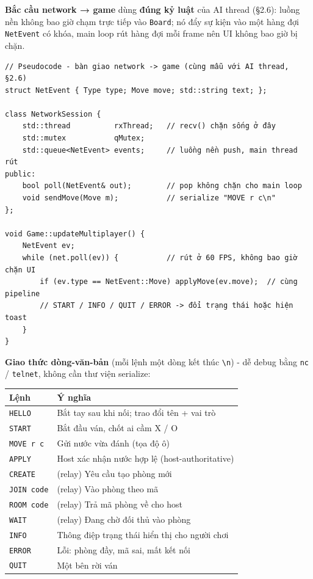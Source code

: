 \documentclass[11pt,a4paper]{article}
\begin{document}
\textbf{Bắc cầu network → game} dùng \textbf{đúng kỷ luật} của AI thread (§2.6): luồng nền không bao giờ chạm trực tiếp vào \texttt{Board}; nó đẩy sự kiện vào một hàng đợi \texttt{NetEvent} có khóa, main loop rút hàng đợi mỗi frame nên UI không bao giờ bị chặn.

\begin{verbatim}
// Pseudocode - bàn giao network -> game (cùng mẫu với AI thread, §2.6)
struct NetEvent { Type type; Move move; std::string text; };

class NetworkSession {
    std::thread          rxThread;   // recv() chặn sống ở đây
    std::mutex           qMutex;
    std::queue<NetEvent> events;     // luồng nền push, main thread rút
public:
    bool poll(NetEvent& out);        // pop không chặn cho main loop
    void sendMove(Move m);           // serialize "MOVE r c\n"
};

void Game::updateMultiplayer() {
    NetEvent ev;
    while (net.poll(ev)) {           // rút ở 60 FPS, không bao giờ chặn UI
        if (ev.type == NetEvent::Move) applyMove(ev.move);  // cùng pipeline
        // START / INFO / QUIT / ERROR -> đổi trạng thái hoặc hiện toast
    }
}
\end{verbatim}

\textbf{Giao thức dòng-văn-bản} (mỗi lệnh một dòng kết thúc \texttt{\textbackslash n}) - dễ debug bằng \texttt{nc} / \texttt{telnet}, không cần thư viện serialize:

\begin{center}
\begin{tabularx}{\textwidth}{lX}
Lệnh & Ý nghĩa\\
\hline
\texttt{HELLO} & Bắt tay sau khi nối; trao đổi tên + vai trò\\
\texttt{START} & Bắt đầu ván, chốt ai cầm X / O\\
\texttt{MOVE r c} & Gửi nước vừa đánh (tọa độ ô)\\
\texttt{APPLY} & Host xác nhận nước hợp lệ (host-authoritative)\\
\texttt{CREATE} & (relay) Yêu cầu tạo phòng mới\\
\texttt{JOIN code} & (relay) Vào phòng theo mã\\
\texttt{ROOM code} & (relay) Trả mã phòng về cho host\\
\texttt{WAIT} & (relay) Đang chờ đối thủ vào phòng\\
\texttt{INFO} & Thông điệp trạng thái hiển thị cho người chơi\\
\texttt{ERROR} & Lỗi: phòng đầy, mã sai, mất kết nối\\
\texttt{QUIT} & Một bên rời ván\\
\end{tabularx}
\end{center}
\end{document}
